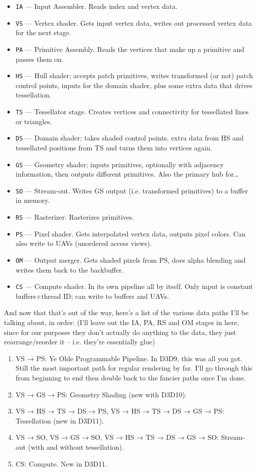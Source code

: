 \documentclass[12pt]{article}
\begin{document}
\begin{itemize}
\item \texttt{IA} — Input Assembler. Reads index and vertex data.
\item \texttt{VS} — Vertex shader. Gets input vertex data, writes out processed vertex data for the next stage.
\item \texttt{PA} — Primitive Assembly. Reads the vertices that make up a primitive and passes them on.
\item \texttt{HS} — Hull shader; accepts patch primitives, writes transformed (or not) patch control points, inputs for the domain shader, plus some extra data that drives tessellation.
\item \texttt{TS} — Tessellator stage. Creates vertices and connectivity for tessellated lines or triangles.
\item \texttt{DS} — Domain shader; takes shaded control points, extra data from HS and tessellated positions from TS and turns them into vertices again.
\item \texttt{GS} — Geometry shader; inputs primitives, optionally with adjacency information, then outputs different primitives. Also the primary hub for…
\item \texttt{SO} — Stream-out. Writes GS output (i.e. transformed primitives) to a buffer in memory.
\item \texttt{RS} — Rasterizer. Rasterizes primitives.
\item \texttt{PS} — Pixel shader. Gets interpolated vertex data, outputs pixel colors. Can also write to UAVs (unordered access views).
\item \texttt{OM} — Output merger. Gets shaded pixels from PS, does alpha blending and writes them back to the backbuffer.
\item \texttt{CS} — Compute shader. In its own pipeline all by itself. Only input is constant buffers+thread ID; can write to buffers and UAVs.
\end{itemize}

And now that that’s out of the way, here’s a list of the various data paths I’ll be talking about, in order: (I’ll leave out the IA, PA, RS and OM stages in here, since for our purposes they don’t actually do anything to the data, they just rearrange/reorder it – i.e. they’re essentially glue)

\begin{enumerate}
\item VS → PS: Ye Olde Programmable Pipeline. In D3D9, this was all you got. Still the most important path for regular rendering by far. I’ll go through this from beginning to end then double back to the fancier paths once I’m done.
\item VS → GS → PS: Geometry Shading (new with D3D10).
\item VS → HS → TS → DS → PS, VS → HS → TS → DS → GS → PS: Tessellation (new in D3D11).
\item VS → SO, VS → GS → SO, VS → HS → TS → DS → GS → SO: Stream-out (with and without tessellation).
\item CS: Compute. New in D3D11.
\end{enumerate}
\end{document}
